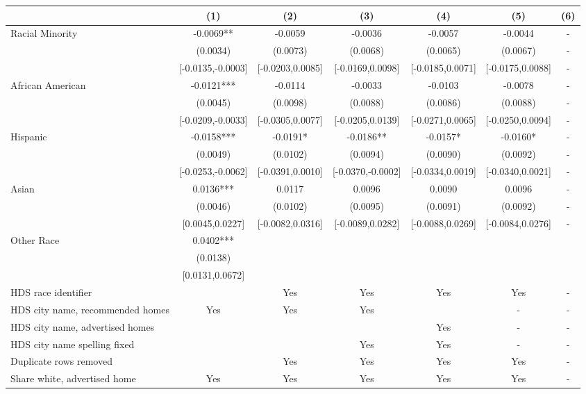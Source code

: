 \begin{table}[htbp]
{\begin{tabular}{l*{6}{c}}
                    \cmidrule(lr){2-2}\cmidrule(lr){3-3}\cmidrule(lr){4-4}\cmidrule(lr){5-5}\cmidrule(lr){6-6}\cmidrule(lr){7-7}
                    &\multicolumn{1}{c}{(1)}   &\multicolumn{1}{c}{(2)}   &\multicolumn{1}{c}{(3)}   &\multicolumn{1}{c}{(4)}   &\multicolumn{1}{c}{(5)}   &\multicolumn{1}{c}{(6)}\\
\midrule
Racial Minority & -0.0069** & -0.0059 & -0.0036 & -0.0057 & -0.0044 & - \\
 & (0.0034) & (0.0073) & (0.0068) & (0.0065) & (0.0067) & - \\
 & [-0.0135,-0.0003] & [-0.0203,0.0085] & [-0.0169,0.0098] & [-0.0185,0.0071] & [-0.0175,0.0088] & - \\
\midrule
African American & -0.0121*** & -0.0114 & -0.0033 & -0.0103 & -0.0078 & - \\
 & (0.0045) & (0.0098) & (0.0088) & (0.0086) & (0.0088) & - \\
 & [-0.0209,-0.0033] & [-0.0305,0.0077] & [-0.0205,0.0139] & [-0.0271,0.0065] & [-0.0250,0.0094] & - \\
Hispanic & -0.0158*** & -0.0191* & -0.0186** & -0.0157* & -0.0160* & - \\
 & (0.0049) & (0.0102) & (0.0094) & (0.0090) & (0.0092) & - \\
 & [-0.0253,-0.0062] & [-0.0391,0.0010] & [-0.0370,-0.0002] & [-0.0334,0.0019] & [-0.0340,0.0021] & - \\
Asian & 0.0136*** & 0.0117 & 0.0096 & 0.0090 & 0.0096 & - \\
 & (0.0046) & (0.0102) & (0.0095) & (0.0091) & (0.0092) & - \\
 & [0.0045,0.0227] & [-0.0082,0.0316] & [-0.0089,0.0282] & [-0.0088,0.0269] & [-0.0084,0.0276] & - \\
Other Race & 0.0402*** &  &  &  &  &  \\
 & (0.0138) &  &  &  &  &  \\
 & [0.0131,0.0672] &  &  &  &  &  \\
\midrule
HDS race identifier & & Yes & Yes & Yes & Yes & - \\
HDS city name, recommended homes & Yes & Yes & Yes & & - & -\\
HDS city name, advertised homes &  &  &  & Yes & - & -\\
HDS city name spelling fixed & & & Yes & Yes & - & -\\
Duplicate rows removed &  & Yes & Yes & Yes & Yes & - \\
\midrule
Share white, advertised home  & Yes & Yes & Yes & Yes & Yes & - \\

\end{tabular}}
\end{table}
